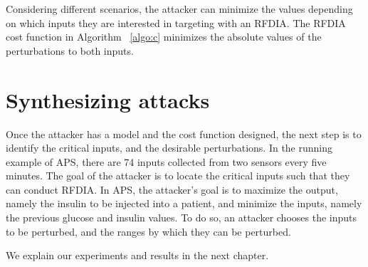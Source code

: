 Considering different scenarios, the attacker can minimize the values depending on which inputs they are interested in targeting with an \ac{RFDIA}. 
The \ac{RFDIA} cost function in Algorithm ~\ref{algo:c} minimizes the absolute values of the perturbations to both inputs.



\section{Synthesizing attacks}
Once the attacker has a model and the cost function designed, the next step is to identify the critical inputs, and the desirable perturbations.
In the running example of APS, there are 74 inputs collected from two sensors every five minutes.
 The goal of the attacker is to locate the critical inputs such that they can conduct \ac{RFDIA}.
 In \ac{APS}, the attacker's goal is to maximize the output, namely the insulin to be injected into a patient, and minimize the inputs, namely the previous glucose and insulin values. 
 To do so, an attacker chooses the inputs to be perturbed, and the ranges by which they can be perturbed.  
  
 
We explain our experiments and results in the next chapter. 

